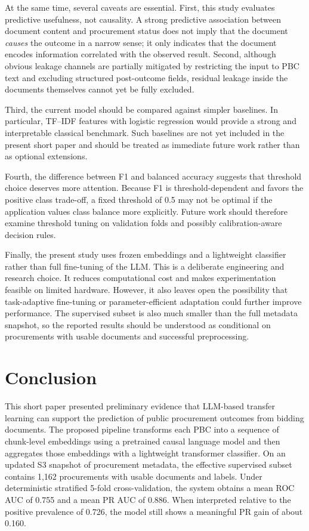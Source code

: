 \documentclass[conference]{IEEEtran}
\begin{document}
At the same time, several caveats are essential. First, this study evaluates predictive usefulness, not causality. A strong predictive association between document content and procurement status does not imply that the document \emph{causes} the outcome in a narrow sense; it only indicates that the document encodes information correlated with the observed result. Second, although obvious leakage channels are partially mitigated by restricting the input to PBC text and excluding structured post-outcome fields, residual leakage inside the documents themselves cannot yet be fully excluded.

Third, the current model should be compared against simpler baselines. In particular, TF--IDF features with logistic regression would provide a strong and interpretable classical benchmark. Such baselines are not yet included in the present short paper and should be treated as immediate future work rather than as optional extensions.

Fourth, the difference between F1 and balanced accuracy suggests that threshold choice deserves more attention. Because F1 is threshold-dependent and favors the positive class trade-off, a fixed threshold of 0.5 may not be optimal if the application values class balance more explicitly. Future work should therefore examine threshold tuning on validation folds and possibly calibration-aware decision rules.

Finally, the present study uses frozen embeddings and a lightweight classifier rather than full fine-tuning of the LLM. This is a deliberate engineering and research choice. It reduces computational cost and makes experimentation feasible on limited hardware. However, it also leaves open the possibility that task-adaptive fine-tuning or parameter-efficient adaptation could further improve performance. The supervised subset is also much smaller than the full metadata snapshot, so the reported results should be understood as conditional on procurements with usable documents and successful preprocessing.

\section{Conclusion}
This short paper presented preliminary evidence that LLM-based transfer learning can support the prediction of public procurement outcomes from bidding documents. The proposed pipeline transforms each PBC into a sequence of chunk-level embeddings using a pretrained causal language model and then aggregates those embeddings with a lightweight transformer classifier. On an updated S3 snapshot of procurement metadata, the effective supervised subset contains 1{,}162 procurements with usable documents and labels. Under deterministic stratified 5-fold cross-validation, the system obtains a mean ROC AUC of 0.755 and a mean PR AUC of 0.886. When interpreted relative to the positive prevalence of 0.726, the model still shows a meaningful PR gain of about 0.160.
\end{document}
